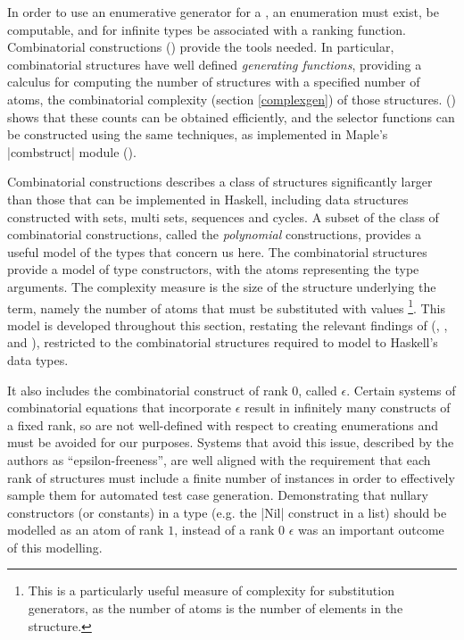 
In order to use an enumerative generator for a \pbt,
an enumeration must exist, be computable,
and for infinite types be associated with a ranking function.
Combinatorial constructions  (\cite{FlajoletSedgewick2009}) provide the tools needed.
In particular, combinatorial structures have well defined \emph{generating functions},
providing a calculus for computing the number of structures 
with a specified number of atoms,
the combinatorial complexity (section \ref{complexgen}) of those structures.
(\cite{FlSaZi91}) shows that these counts can be obtained efficiently,
and the selector functions can be constructed using the same techniques,
as implemented in Maple's |combstruct| module 
(\cite{FlSa95}).

Combinatorial constructions describes a class of structures significantly larger than those that can be implemented in Haskell,
including data structures constructed with sets, multi sets, sequences and cycles.
A subset of the class of combinatorial constructions,
called the \emph{polynomial} constructions,
provides a useful model of the types that concern us here.
The combinatorial structures provide a model of type constructors,
with the atoms representing the type arguments.
The complexity measure is the size of the structure underlying the term,
namely the number of atoms that must be substituted with values%
\footnote{This is a particularly useful measure of complexity 
for substitution generators, as the number of atoms is the number of elements in the structure.}.
This model is developed throughout this section,
restating the relevant findings of
(\cite{FlSaZi89b}, \cite{FlajoletZC94}, \cite{FlSa95} and \cite{FlajoletSedgewick2009}),
restricted to the combinatorial structures required to model to Haskell's data types.

It also includes the combinatorial construct of rank $0$, called $\epsilon$.
Certain systems of combinatorial equations that incorporate $\epsilon$
result in infinitely many constructs of a fixed rank,
so are not well-defined with respect to creating enumerations
and must be avoided for our purposes.
Systems that avoid this issue, described by the authors as ``epsilon-freeness'',
are well aligned with the requirement that each rank of structures 
must include a finite number of instances in order to effectively sample them
for automated test case generation.
Demonstrating that nullary constructors (or constants) in a type
(e.g. the |Nil| construct in a list) should be modelled as an atom of rank $1$,
instead of a rank $0$ $\epsilon$ was an important outcome of this modelling.

